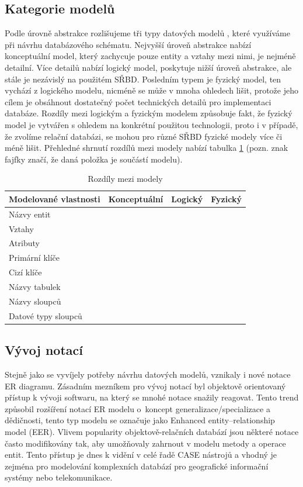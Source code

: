 \documentclass[czech,bachelor,public,dept460,male,oneside]{diploma}
\newcommand{\xmark}{\ding{55}}
\newcommand{\cmark}{\ding{51}}
\begin{document}
	\subsection{Kategorie modelů} \label{secModelCategory}
	Podle úrovně abstrakce rozlišujeme tři typy datových modelů \cite{whatIsERD}, které využíváme při návrhu databázového schématu. Nejvyšší úroveň abstrakce nabízí konceptuální model, který zachycuje pouze entity a vztahy mezi nimi, je nejméně detailní. Více detailů nabízí logický model, poskytuje nižší úroveň abstrakce, ale stále je nezávislý na použitém SŘBD. Posledním typem je fyzický model, ten vychází z logického modelu, nicméně se může v mnoha ohledech lišit, protože jeho cílem je obsáhnout dostatečný počet technických detailů pro implementaci databáze. Rozdíly mezi logickým a fyzickým modelem způsobuje fakt, že fyzický model je vytvářen s ohledem na konkrétní použitou technologii, proto i v případě, že zvolíme relační databázi, se mohou pro různé SŘBD fyzické modely více či méně lišit. Přehledné shrnutí rozdílů mezi modely nabízí tabulka \ref{tab:modelTypes} (pozn. znak fajfky značí, že daná položka je součástí modelu).
	
	\begin{table}[!h]
		\centering
		\caption{Rozdíly mezi modely}
		\label{tab:modelTypes}
		\begin{tabular}{l c c c}
			\toprule
			Modelované vlastnosti & Konceptuální & Logický & Fyzický \\
			\midrule
			Názvy entit & \cmark & \cmark & \xmark \\
			Vztahy & \cmark& \cmark & \xmark \\
			Atributy & \cmark& \cmark & \xmark \\
			Primární klíče & \xmark & \cmark & \cmark \\
			Cizí klíče & \xmark & \cmark & \cmark \\
			Názvy tabulek & \xmark & \xmark & \cmark \\
			Názvy sloupců & \xmark & \xmark & \cmark \\
			Datové typy sloupců & \xmark & \xmark & \cmark \\
			\midrule
		\end{tabular}
	\end{table}
	
	\subsection{Vývoj notací}
	Stejně jako se vyvíjely potřeby návrhu datových modelů, vznikaly i nové notace ER diagramu. Zásadním mezníkem pro vývoj notací byl objektově orientovaný přístup k vývoji softwaru, na který se mnohé notace snažily reagovat. Tento trend způsobil rozšíření notací ER modelu o~koncept generalizace/specializace a dědičnosti, tento typ modelu se označuje jako  Enhanced entity–relationship model (EER). Vlivem popularity objektově-relačních databází jsou některé notace často modifikovány tak, aby umožňovaly zahrnout v modelu metody a operace entit. Tento přístup je dnes k vidění v celé řadě CASE nástrojů a  vhodný je zejména pro modelování komplexních databází pro geografické informační systémy nebo telekomunikace.
	
\end{document}
